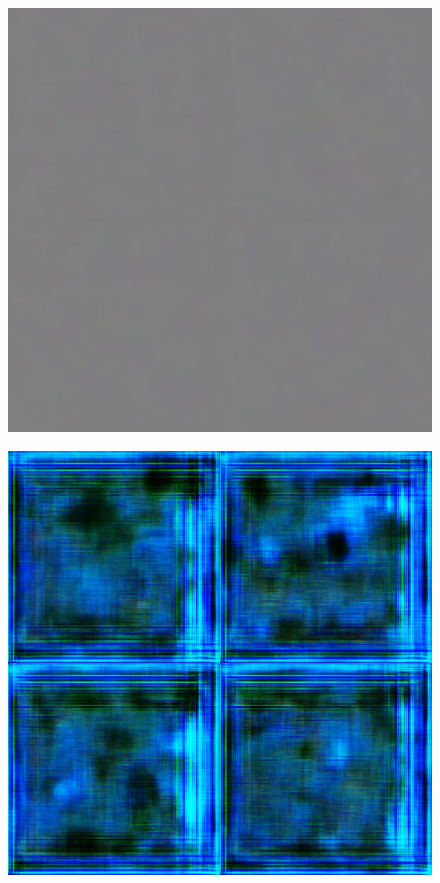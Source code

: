 \begin{figure}[H]
	\centering
	
	\begin{minipage}{0.24\columnwidth}
		\centering
		\includegraphics[clip, width=\linewidth]{fig/generative_adversarial_nets/0000_0000}
		\label{fig:}
	\end{minipage}
	\begin{minipage}{0.24\columnwidth}
		\centering
		\includegraphics[clip, width=\linewidth]{fig/generative_adversarial_nets/0079_0000}

\end{minipage}
\end{figure}
